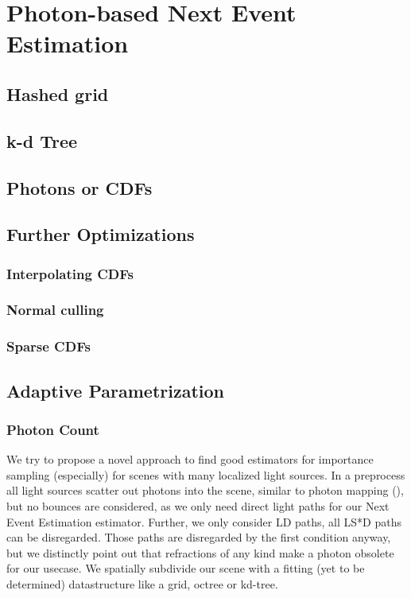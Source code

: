 
\chapter{Photon-based Next Event Estimation}
\label{ch:PNEE}

\section{Hashed grid}

\section{k-d Tree}

\section{Photons or CDFs}

\section{Further Optimizations}

\subsection{Interpolating CDFs}

\subsection{Normal culling}

\subsection{Sparse CDFs}

\section{Adaptive Parametrization}

\subsection{Photon Count}


We try to propose a novel approach to find good estimators for importance sampling (especially) for scenes with many localized light sources. In a preprocess all light sources scatter out photons into the scene, similar to photon mapping (\cite{jensen2001realistic}), but no bounces are considered, as we only need direct light paths for our Next Event Estimation estimator. Further, we only consider LD paths, all LS*D paths can be disregarded. Those paths are disregarded by the first condition anyway, but we distinctly point out that refractions of any kind make a photon obsolete for our usecase. We spatially subdivide our scene with a fitting (yet to be determined) datastructure like a grid, octree or kd-tree. 

